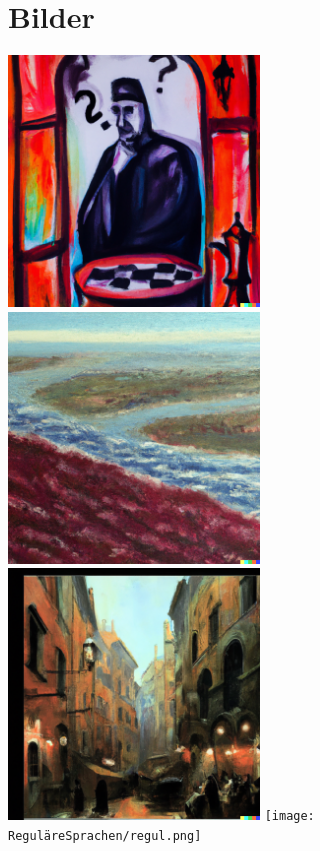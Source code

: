 \section{Bilder}

\includegraphics[width=0.5\textwidth]{Turingmachine/turing.png}
\includegraphics[width=0.5\textwidth]{Berechenbarkeit/predic.png}
\includegraphics[width=0.5\textwidth]{Automaten/finit1.png}
\texttt{[image: ReguläreSprachen/regul.png]}

